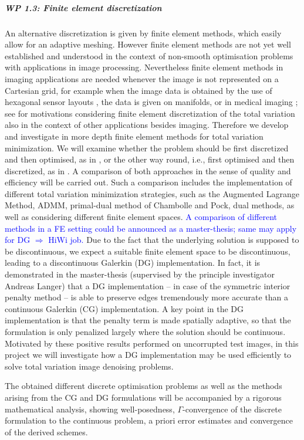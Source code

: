 \documentclass[enabledeprecatedfontcommands,cleardoublepage=empty,headsepline,twoside,11pt,DIV=15,BCOR=12mm,final]{scrartcl}
\begin{document}
 \subparagraph{WP 1.3: Finite element discretization}
 
 An alternative discretization is given by finite element methods, which easily allow for an adaptive meshing. However finite element methods are not yet well established and understood in the context of non-smooth optimisation problems with applications in image processing. Nevertheless finite element methods in imaging applications are needed whenever the image is not represented on a Cartesian grid, for example when the image data is obtained by the use of hexagonal sensor layouts \cite{}, the data is given on manifolds, or in medical imaging \cite{}; see \cite{} for motivations considering finite element discretization of the total variation also in the context of other applications besides imaging.  
  Therefore we develop and investigate in more depth finite element methods for total variation minimization. We will examine whether the problem should be first discretized and then optimised, as in \cite{Herzog etal}, or the other way round, i.e., first optimised and then discretized, as in \cite{AlkLan}. A comparison of both approaches in the sense of quality and efficiency will be carried out. Such a comparison includes the implementation of different total variation minimization strategies, such as the Augmented Lagrange Method, ADMM, primal-dual method of Chambolle and Pock, dual methods, as well as considering different finite element spaces. \textcolor{blue}{A comparison of different methods in a FE setting could be announced as a master-thesis; same may apply for DG $\Rightarrow$ HiWi job.} Due to the fact that the underlying solution is supposed to be discontinuous, we expect a suitable finite element space to be discontinuous, leading to a discontinuous Galerkin (DG) implementation. In fact, it is demonstrated in the master-thesis \cite{Dieterich} (supervised by the principle investigator Andreas Langer) that a DG implementation -- in case of the symmetric interior penalty method -- is able to preserve edges tremendously more accurate than a continuous Galerkin (CG) implementation. A key point in the DG implementation is that the penalty term is made spatially adaptive, so that the formulation is only penalized largely where the solution should be continuous. Motivated by these positive results performed on uncorrupted test images, in this project we will investigate how a DG implementation may be used efficiently to solve total variation image denoising problems. 
  
  The obtained different discrete optimisation problems as well as the methods arising from the CG and DG formulations will be accompanied by a rigorous mathematical analysis, showing well-posedness,  $\Gamma$-convergence of the discrete formulation to the continuous problem, a priori error estimates and convergence of the derived schemes.
  
\end{document}

